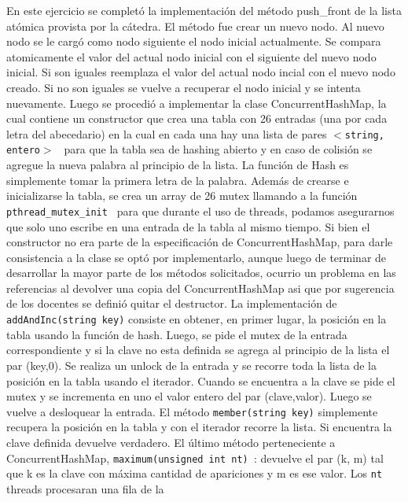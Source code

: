 \documentclass[a4paper]{article}
\begin{document}
{En este ejercicio se completó la implementación del método push_front de la lista atómica provista por la cátedra. El método fue crear un nuevo nodo. Al nuevo nodo se le cargó como nodo siguiente el nodo inicial actualmente. Se compara atomicamente el valor del actual nodo inicial con el siguiente del nuevo nodo inicial. Si son iguales reemplaza el valor del actual nodo incial con el nuevo nodo creado. Si no son iguales se vuelve a recuperar el nodo inicial y se intenta nuevamente. \newline
Luego se procedió a implementar la clase ConcurrentHashMap, la cual contiene un constructor que crea una tabla con 26 entradas (una por cada letra del abecedario) en la cual en cada una hay una lista de pares {\tt $<$string, entero$>$ } para que la tabla sea de hashing abierto y en caso de colisión se agregue la nueva palabra al principio de la lista. La función de Hash es simplemente tomar la primera letra de la palabra. Además de crearse e inicializarse la tabla, se crea un array de 26 mutex llamando a la función {\tt pthread_mutex_init } para que durante el uso de threads, podamos asegurarnos que solo uno escribe en una entrada de la tabla al mismo tiempo. \newline
Si bien el constructor no era parte de la especificación de ConcurrentHashMap, para darle consistencia a la clase se optó por implementarlo, aunque luego de terminar de desarrollar la mayor parte de los métodos solicitados, ocurrio un problema en las referencias al devolver una copia del ConcurrentHashMap asi que por sugerencia de los docentes se definió quitar el destructor.
\newline
La implementación de {\tt addAndInc(string key)} consiste en obtener, en primer lugar, la posición en la tabla usando la función de hash. Luego, se pide el mutex de la entrada correspondiente y si la clave no esta definida se agrega al principio de la lista el par (key,0). Se realiza un unlock de la entrada y se recorre toda la lista de la posición en la tabla usando el iterador. Cuando se encuentra a la clave se pide el mutex y se incrementa en uno el valor entero del par (clave,valor). Luego se vuelve a desloquear la entrada.
\newline
El método {\tt member(string key)} simplemente recupera la posición en la tabla y con el iterador recorre la lista. Si encuentra la clave definida devuelve verdadero.
\newline
El último método perteneciente a ConcurrentHashMap, {\tt maximum(unsigned int nt) }: devuelve el par (k, m) tal que
k es la clave con máxima cantidad de apariciones y m es ese valor. Los {\tt nt} threads procesaran una fila de la
}
\end{document}
